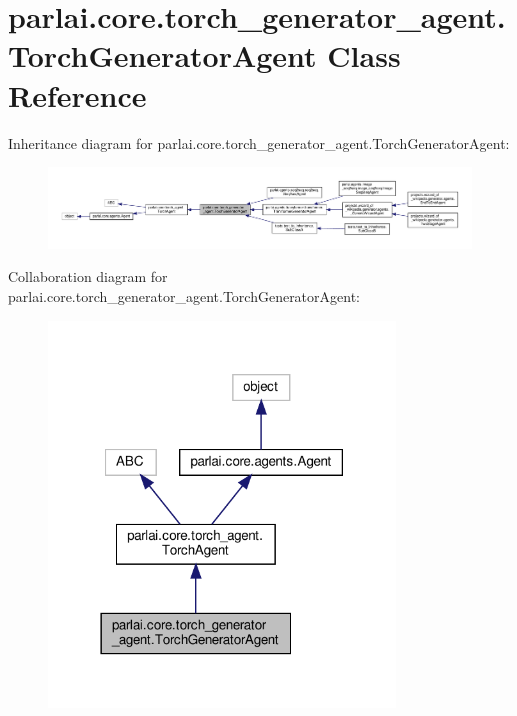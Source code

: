 \hypertarget{classparlai_1_1core_1_1torch__generator__agent_1_1TorchGeneratorAgent}{}\section{parlai.\+core.\+torch\+\_\+generator\+\_\+agent.\+Torch\+Generator\+Agent Class Reference}
\label{classparlai_1_1core_1_1torch__generator__agent_1_1TorchGeneratorAgent}


Inheritance diagram for parlai.\+core.\+torch\+\_\+generator\+\_\+agent.\+Torch\+Generator\+Agent\+:
\nopagebreak
\begin{figure}[H]
\begin{center}
\leavevmode
\includegraphics[width=350pt]{df/d9f/classparlai_1_1core_1_1torch__generator__agent_1_1TorchGeneratorAgent__inherit__graph}
\end{center}
\end{figure}


Collaboration diagram for parlai.\+core.\+torch\+\_\+generator\+\_\+agent.\+Torch\+Generator\+Agent\+:
\nopagebreak
\begin{figure}[H]
\begin{center}
\leavevmode
\includegraphics[width=261pt]{d5/d12/classparlai_1_1core_1_1torch__generator__agent_1_1TorchGeneratorAgent__coll__graph}
\end{center}
\end{figure}
